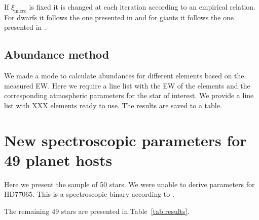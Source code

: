 \documentclass{aa}
\begin{document}
If $\xi_\mathrm{micro}$ is fixed it is changed at each iteration according to
an empirical relation. For dwarfs it follows the one presented in
\citet{Tsantaki2013} and for giants it follows the one presented in
\citet{Adibekyan2015}.



\subsection{Abundance method}
\label{sub:Abundance_method}

We made a mode to calculate abundances for different elements based on the
measured EW. Here we require a line list with the EW of the elements and
the corresponding atmospheric parameters for the star of interest. We provide
a line list with XXX elements ready to use. The results are saved to a table.











\section{New spectroscopic parameters for 49 planet hosts}
\label{sec:results}
Here we present the sample of 50 stars. We were unable to derive parameters for
HD77065. This is a spectroscopic binary according to \cite{Pourbaix2004}.

The remaining 49 stars are presented in Table~\ref{tab:results}.
\end{document}
